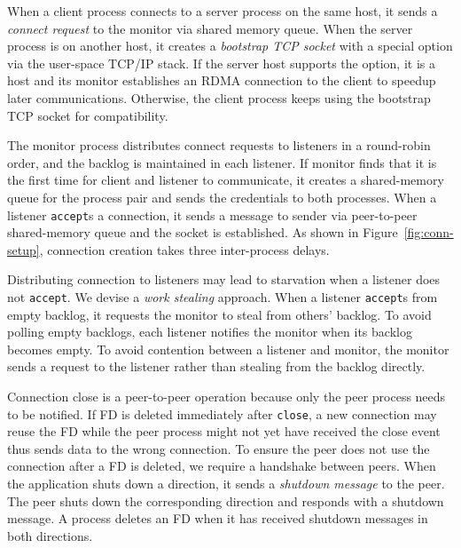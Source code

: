 When a client process connects to a server process on the same host, it sends a \textit{connect request} to the monitor via shared memory queue. When the server process is on another host, it creates a \textit{bootstrap TCP socket} with a special option via the user-space TCP/IP stack. If the server host supports the option, it is a \sys host and its monitor establishes an RDMA connection to the client to speedup later communications. Otherwise, the client process keeps using the bootstrap TCP socket for compatibility.

The monitor process distributes connect requests to listeners in a round-robin order, and the backlog is maintained in each listener. If monitor finds that it is the first time for client and listener to communicate, it creates a shared-memory queue for the process pair and sends the credentials to both processes. When a listener \texttt{accept}s a connection, it sends a message to sender via peer-to-peer shared-memory queue and the socket is established. As shown in Figure~\ref{fig:conn-setup}, connection creation takes three inter-process delays.

Distributing connection to listeners may lead to starvation when a listener does not \texttt{accept}. We devise a \textit{work stealing} approach. When a listener \texttt{accept}s from empty backlog, it requests the monitor to steal from others' backlog. To avoid polling empty backlogs, each listener notifies the monitor when its backlog becomes empty. To avoid contention between a listener and monitor, the monitor sends a request to the listener rather than stealing from the backlog directly.


Connection close is a peer-to-peer operation because only the peer process needs to be notified. If FD is deleted immediately after \texttt{close}, a new connection may reuse the FD while the peer process might not yet have received the close event thus sends data to the wrong connection. To ensure the peer does not use the connection after a FD is deleted, we require a handshake between peers.
When the application shuts down a direction, it sends a \textit{shutdown message} to the peer. The peer shuts down the corresponding direction and responds with a shutdown message. A process deletes an FD when it has received shutdown messages in both directions.

